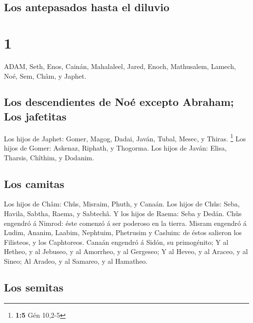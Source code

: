 \hypertarget{los-antepasados-hasta-el-diluvio}{%
\subsection{Los antepasados \hspace{0pt}\hspace{0pt}hasta el
diluvio}\label{los-antepasados-hasta-el-diluvio}}

\hypertarget{section}{%
\section{1}\label{section}}

 ADAM, Seth, Enos,  Cainán, Mahalaleel, Jared,
 Enoch, Mathusalem, Lamech,  Noé, Sem, Châm, y
Japhet.

\hypertarget{los-descendientes-de-nouxe9-excepto-abraham-los-jafetitas}{%
\subsection{Los descendientes de Noé excepto Abraham; Los
jafetitas}\label{los-descendientes-de-nouxe9-excepto-abraham-los-jafetitas}}

 Los hijos de Japhet: Gomer, Magog, Dadai, Javán, Tubal,
Mesec, y Thiras. \footnote{\textbf{1:5} Gén 10,2-5}  Los
hijos de Gomer: Askenaz, Riphath, y Thogorma.  Los hijos de
Javán: Elisa, Tharsis, Chîthim, y Dodanim.

\hypertarget{los-camitas}{%
\subsection{Los camitas}\label{los-camitas}}

 Los hijos de Châm: Chûs, Misraim, Phuth, y Canaán.
 Los hijos de Chûs: Seba, Havila, Sabtha, Raema, y Sabtechâ.
Y los hijos de Raema: Seba y Dedán.  Chûs engendró á
Nimrod: éste comenzó á ser poderoso en la tierra.  Misram
engendró á Ludim, Ananim, Laabim, Nephtuim,  Phetrusim y
Casluim: de éstos salieron los Filisteos, y los Caphtoreos.
 Canaán engendró á Sidón, su primogénito;  Y
al Hetheo, y al Jebuseo, y al Amorrheo, y al Gergeseo;  Y
al Heveo, y al Araceo, y al Sineo;  Al Aradeo, y al
Samareo, y al Hamatheo.

\hypertarget{los-semitas}{%
\subsection{Los semitas}\label{los-semitas}}

